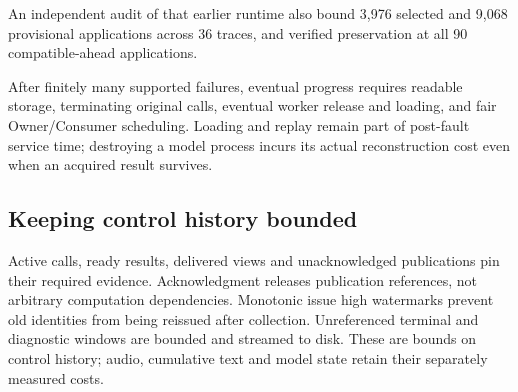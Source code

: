 An independent audit of that earlier runtime also bound 3,976 selected
and 9,068 provisional applications across 36 traces, and verified
preservation at all 90 compatible-ahead applications.

\label{prop:continued_service}
After finitely many supported failures, eventual progress requires readable
storage, terminating original calls, eventual worker release and loading,
and fair Owner/Consumer scheduling. Loading and replay remain part of
post-fault service time; destroying a model process incurs its actual
reconstruction cost even when an acquired result survives.

\subsection{Keeping control history bounded}
Active calls, ready results, delivered views and unacknowledged
publications pin their required evidence. Acknowledgment releases
publication references, not arbitrary computation dependencies. Monotonic
issue high watermarks prevent old identities from being reissued after
collection. Unreferenced terminal and diagnostic windows are bounded and
streamed to disk. These are bounds on control history; audio, cumulative
text and model state retain their separately measured costs.

